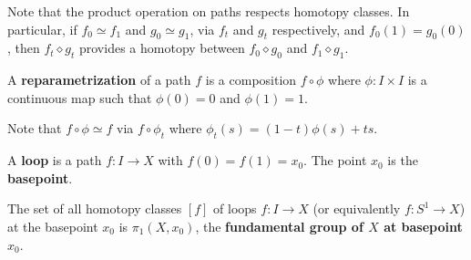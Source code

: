 \documentclass{../mathnotes}
\begin{document}
\begin{rem}
    Note that the product operation on paths respects homotopy classes. In particular, if $f_0\simeq f_1$ and
    $g_0\simeq g_1$, via $f_t$ and $g_t$ respectively, and $f_0(1)=g_0(0)$, then $f_t\diamond g_t$ provides
    a homotopy between $f_0\diamond g_0$ and $f_1\diamond g_1$.
\end{rem}

\begin{defn}
    A \textbf{reparametrization} of a path $f$ is a composition $f\circ \phi$ where $\phi:I\times I$ is
    a continuous map such that $\phi(0)=0$ and $\phi(1)=1$.
\end{defn}

\begin{rem}
    Note that $f\circ\phi\simeq f$ via $f\circ \phi_t$ where $\phi_t(s)=(1-t)\phi(s)+ts$.
\end{rem}

\begin{defn}
    A \textbf{loop} is a path $f:I\to X$ with $f(0)=f(1)=x_0$. The point $x_0$ is the \textbf{basepoint}.
\end{defn}

\begin{defn}
    The set of all homotopy classes $[f]$ of loops $f:I\to X$ (or equivalently $f:S^1\to X$) at the basepoint
    $x_0$ is $\pi_1(X,x_0)$, the \textbf{fundamental group of $X$ at basepoint $x_0$}.
\end{defn}
\end{document}

